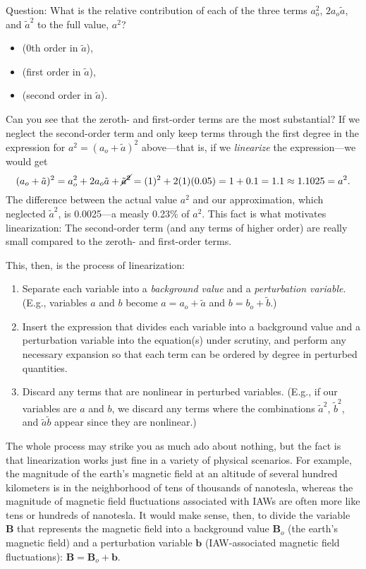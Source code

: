 Question: What is the relative contribution of each of the three terms $a_o^2$,
$2 a_o \tilde a$, and $\tilde a^2$ to the full value, $a^2$?
\begin{itemize}
\item {} (0th order in $\tilde a$),
\item {} (first order in $\tilde a$),
\item {} (second order in $\tilde a$).
\end{itemize}

Can you see that the zeroth- and first-order terms are the most substantial? If
we neglect the second-order term and only keep terms through the first degree in
the expression for $a^2 = (a_o + \tilde a)^2$ above---that is, if we
\emph{linearize} the expression---we would get
\begin{equation*}
  (a_o + \tilde a)^2 = a_o^2 + 2 a_o \tilde a + \cancel{{\tilde a}^2} = (1)^2 + 2(1)(0.05) = 1 + 0.1 = 1.1 \approx 1.1025 = a^2.
\end{equation*}
The difference between the actual value $a^2$ and our approximation, which
neglected $\tilde a^2$, is 0.0025---a measly 0.23\% of $a^2$. This fact is what
motivates linearization: The second-order term (and any terms of higher order)
are really small compared to the zeroth- and first-order terms.

This, then, is the process of linearization: 
\begin{enumerate}
\item Separate each variable into a \emph{background value} and a
  \emph{perturbation variable}.  (E.g., variables $a$ and $b$ become
  $a = a_o + \tilde a$ and $b = b_o + \tilde b$.)
\item Insert the expression that divides each variable into a background value
  and a perturbation variable into the equation(s) under scrutiny, and perform
  any necessary expansion so that each term can be ordered by degree in
  perturbed quantities.
\item Discard any terms that are nonlinear in perturbed variables. (E.g., if our
  variables are $a$ and $b$, we discard any terms where the combinations
  $\tilde a^2$, $\tilde b^2$, and $\tilde a \tilde b$ appear since they are nonlinear.)
\end{enumerate}

The whole process may strike you as much ado about nothing, but the fact is that
linearization works just fine in a variety of physical scenarios. For example,
the magnitude of the earth's magnetic field at an altitude of several hundred
kilometers is in the neighborhood of tens of thousands of nanotesla, whereas the
magnitude of magnetic field fluctuations associated with IAWs are often more
like tens or hundreds of nanotesla. It would make sense, then, to divide the
variable $\mathbf{B}$ that represents the magnetic field into a background value
$\mathbf{B}_o$ (the earth's magnetic field) and a perturbation variable
$\mathbf{b}$ (IAW-associated magnetic field fluctuations):
$\mathbf{B} = \mathbf{B}_o + \mathbf{b}$.

